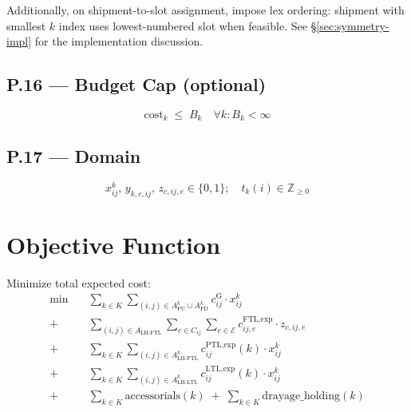 \documentclass[11pt,a4paper]{article}
\theoremstyle{definition}
\begin{document}
Additionally, on shipment-to-slot assignment, impose lex ordering: shipment with smallest $k$
index uses lowest-numbered slot when feasible. See \S\ref{sec:symmetry-impl} for the
implementation discussion.

\subsection*{P.16 — Budget Cap (optional)}
\begin{equation}
  \text{cost}_k \;\leq\; B_k \quad \forall k : B_k < \infty
  \label{eq:tk-P16}
\end{equation}

\subsection*{P.17 — Domain}
\begin{equation}
  x_{ij}^k,\, y_{k,c,ij},\, z_{c,ij,e} \in \{0,1\}; \quad t_k(i) \in \mathbb{Z}_{\geq 0}
  \label{eq:tk-P17}
\end{equation}

\section{Objective Function}

Minimize total expected cost:
\begin{align}
  \min \quad
  & \sum_{k \in K} \sum_{(i,j) \in A^k_{\text{PU}} \cup A^k_{\text{FD}}} c_{ij}^{\text{G}} \cdot x_{ij}^k
    \tag{pickup + delivery ground} \\
  +\;
  & \sum_{(i,j) \in A_{\text{LH-FTL}}} \sum_{c \in C_{ij}} \sum_{e \in \mathcal{E}} c_{ij,e}^{\text{FTL,exp}} \cdot z_{c,ij,e}
    \tag{FTL truck cost (per-truck, expected)} \\
  +\;
  & \sum_{k \in K} \sum_{(i,j) \in A^k_{\text{LH-PTL}}} c_{ij}^{\text{PTL,exp}}(k) \cdot x_{ij}^k
    \tag{PTL per-shipment cost (expected)} \\
  +\;
  & \sum_{k \in K} \sum_{(i,j) \in A^k_{\text{LH-LTL}}} c_{ij}^{\text{LTL,exp}}(k) \cdot x_{ij}^k
    \tag{LTL pre-computed cost (expected)} \\
  +\;
  & \sum_{k \in K} \text{accessorials}(k) \;+\; \sum_{k \in K} \text{drayage\_holding}(k)
    \tag{accessorials + chassis/per diem/demurrage}
\end{align}
\end{document}
